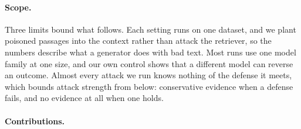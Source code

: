 \paragraph{Scope.}
Three limits bound what follows. Each setting runs on one dataset, and we plant
poisoned passages into the context rather than attack the retriever, so the
numbers describe what a generator does with bad text. Most runs use one model
family at one size, and our own control shows that a different model can reverse
an outcome. Almost every attack we run knows nothing of the defense it meets,
which bounds attack strength from below: conservative evidence when a defense
fails, and no evidence at all when one holds.

\paragraph{Contributions.}
